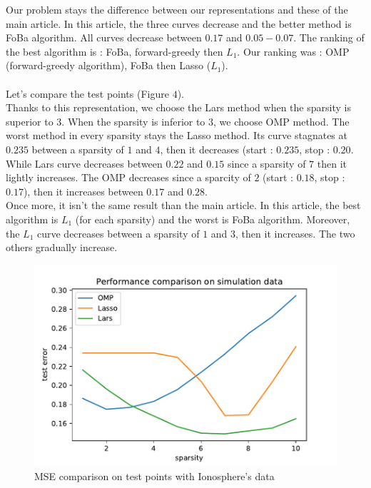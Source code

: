 \documentclass{article}
\begin{document}
Our problem stays the difference between our representations and these of the main article. In this article, the three curves decrease and the better method is FoBa algorithm. All curves decrease between $0.17$ and $0.05-0.07$. The ranking of the best algorithm is : FoBa, forward-greedy then $L_1$. Our ranking was : OMP (forward-greedy algorithm), FoBa then Lasso ($L_1$).\\
\\
Let's compare the test points (Figure $4$).\\
Thanks to this representation, we choose the Lars method when the sparsity is superior to $3$. When the sparsity is inferior to $3$, we choose OMP method. The worst method in every sparsity stays the Lasso method. Its curve stagnates at $0.235$ between a sparsity of $1$ and $4$, then it decreases (start : $0.235$, stop : $0.20$. While Lars curve decreases between $0.22$ and $0.15$ since a sparsity of $7$ then it lightly increases. The OMP decreases since a sparcity of $2$ (start : $0.18$, stop : $0.17$), then it increases between $0.17$ and $0.28$.\\
Once more, it isn't the same result than the main article. In this article, the best algorithm is $L_1$ (for each sparsity) and the worst is  FoBa algorithm. Moreover, the $L_1$ curve decreases between a sparsity of $1$ and $3$, then it increases. The two others gradually increase.\\ 
\begin{figure}[!ht]
    \centering
    \includegraphics[scale=0.5]{./images/test_error_ionosphere.pdf}
    \caption{MSE comparison on test points with Ionosphere's data}
    \label{Figure 4}
\end{figure}
\end{document}
